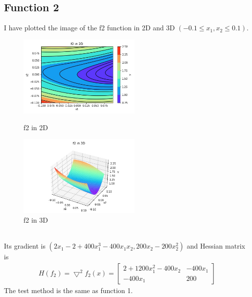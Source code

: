 \documentclass[a4paper,12pt]{article}
\begin{document}
\subsection{Function 2}
I have plotted the image of the f2 function in 2D and 3D $(-0.1 \leq x_1, x_2 \leq 0.1)$.\\
\begin{figure}[htbp]
\centering
\begin{minipage}[t]{0.48\textwidth}
\centering
\includegraphics[width=6cm]{f2_2d.jpg}
\caption{f2 in 2D}
\end{minipage}
\begin{minipage}[t]{0.48\textwidth}
\centering
\includegraphics[width=6cm]{f2_3d.jpg}
\caption{f2 in 3D}
\end{minipage}
\end{figure}\\
Its gradient is $(2x_1 - 2 + 400x_1^3 - 400x_1x_2, 200x_2-200x_2^2)$ and Hessian matrix is 
\begin{align*}
H(f_2) = \bigtriangledown^2 f_2(x) = 
\begin{bmatrix}
2+1200x_1^2-400x_2 & -400x_1 \\
-400x_1 & 200
\end{bmatrix}
\end{align*}
The test method is the same as function 1.
\end{document}
